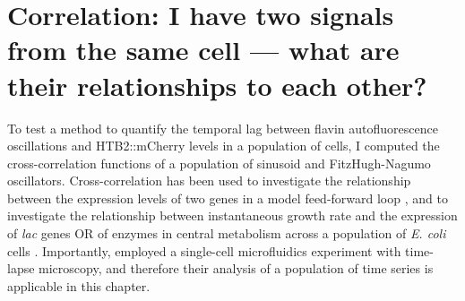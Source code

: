 


\section[Correlation]{Correlation: I have two signals from the same cell --- what are their relationships to each other?}
\label{sec:analysis-correlation}


To test a method to quantify the temporal lag between flavin autofluorescence oscillations and HTB2::mCherry levels in a population of cells, I computed the cross-correlation functions of a population of sinusoid and FitzHugh-Nagumo oscillators.
Cross-correlation has been used to investigate the relationship between the expression levels of two genes in a model feed-forward loop \parencite{dunlopRegulatoryActivityRevealed2008},
and to investigate the relationship between instantaneous growth rate and the expression of \textit{lac} genes OR of enzymes in central metabolism across a population of \textit{E. coli} cells \parencite{kivietStochasticityMetabolismGrowth2014}.
Importantly, \textcite{kivietStochasticityMetabolismGrowth2014} employed a single-cell microfluidics experiment with time-lapse microscopy, and therefore their analysis of a population of time series is applicable in this chapter.

